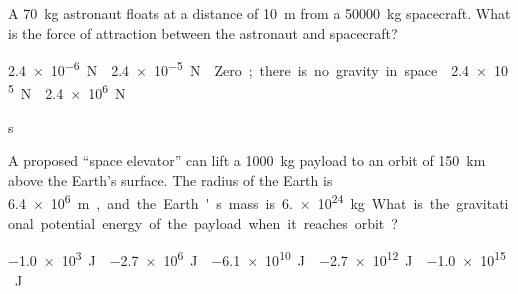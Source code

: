 \documentclass{../../oss-apphys-exam}
\begin{document}
\genheader



\raggedcolumns
\begin{multicols*}{2}
  \begin{questions}
    \question A \SI{70}{\kilo\gram} astronaut floats at a distance of
    \SI{10}{\metre} from a \SI{50000}{\kilo\gram} spacecraft. What is the force
    of attraction between the astronaut and spacecraft?
    \begin{choices}
      \choice\SI{2.4e-6}\newton
      \choice\SI{2.4e-5}\newton
      \choice Zero; there is no gravity in space.
      \choice\SI{2.4e5}\newton
      \choice\SI{2.4e6}\newton
    \end{choices}
    \vspace{.5in}
    
s%
    
    \question A proposed ``space elevator'' can lift a \SI{1000}{\kilo\gram}
    payload to an orbit of \SI{150}{\kilo\metre} above the Earth's surface. The
    radius of the Earth is \SI{6.4e6}\metre, and the Earth's mass is
    \SI{6.e24}{\kilo\gram}. What is the gravitational potential energy of the
    payload when it reaches orbit?
    \begin{choices}
      \choice\SI{-1.0e3}\joule
      \choice\SI{-2.7e6}\joule
      \choice\SI{-6.1e10}\joule
      \choice\SI{-2.7e12}\joule
      \choice\SI{-1.0e15}\joule
    \end{choices}
    
%    


\end{questions}
\end{multicols*}
\end{document}
